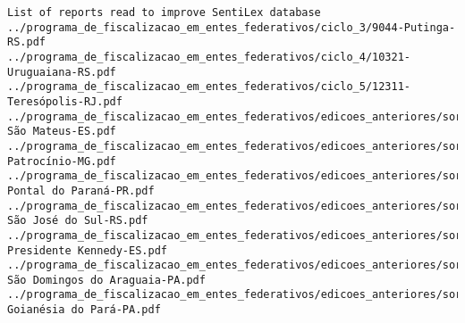 \begin{lstlisting}
List of reports read to improve SentiLex database
../programa_de_fiscalizacao_em_entes_federativos/ciclo_3/9044-Putinga-RS.pdf
../programa_de_fiscalizacao_em_entes_federativos/ciclo_4/10321-Uruguaiana-RS.pdf
../programa_de_fiscalizacao_em_entes_federativos/ciclo_5/12311-Teresópolis-RJ.pdf
../programa_de_fiscalizacao_em_entes_federativos/edicoes_anteriores/sorteio_34/1837-São Mateus-ES.pdf
../programa_de_fiscalizacao_em_entes_federativos/edicoes_anteriores/sorteio_35/1906-Patrocínio-MG.pdf
../programa_de_fiscalizacao_em_entes_federativos/edicoes_anteriores/sorteio_36/2483-Pontal do Paraná-PR.pdf
../programa_de_fiscalizacao_em_entes_federativos/edicoes_anteriores/sorteio_37/2871-São José do Sul-RS.pdf
../programa_de_fiscalizacao_em_entes_federativos/edicoes_anteriores/sorteio_38/2975-Presidente Kennedy-ES.pdf
../programa_de_fiscalizacao_em_entes_federativos/edicoes_anteriores/sorteio_39/3179-São Domingos do Araguaia-PA.pdf
../programa_de_fiscalizacao_em_entes_federativos/edicoes_anteriores/sorteio_40/3390-Goianésia do Pará-PA.pdf
\end{lstlisting}

